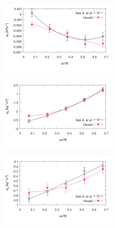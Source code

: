 \begin{figure}[H]
	\centering
	\includegraphics[width=0.5\textwidth]{ap.png}
\end{figure}

\begin{figure}[H]
	\centering
	\includegraphics[width=0.5\textwidth]{arho.png}
\end{figure}

\begin{figure}[H]
	\centering
	\includegraphics[width=0.5\textwidth]{brho.png}
\end{figure}




